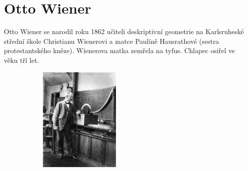 \documentclass[12pt,a4paper,titlepage,final]{report}
\begin{document}
\section{Otto Wiener}

Otto Wiener se narodil roku 1862 učiteli deskriptivní geometrie na Karlsruheské střední škole Christianu Wienerovi 
a matce Paulíně Hausrathové (sestra protestantského kněze). Wienerova matka zemřela na tyfus. Chlapec osiřel ve věku tří let. \cite{encyclopedia_otto}

\begin{figure}[!htb]
	\centering
	\begin{subfigure}[b]{0.4\textwidth}
 		\includegraphics[width=\textwidth]{Otto_Wiener}
	\end{subfigure}
	~ %
	\begin{subfigure}[b]{0.4\textwidth}

\end{subfigure}
\end{figure}
\end{document}
